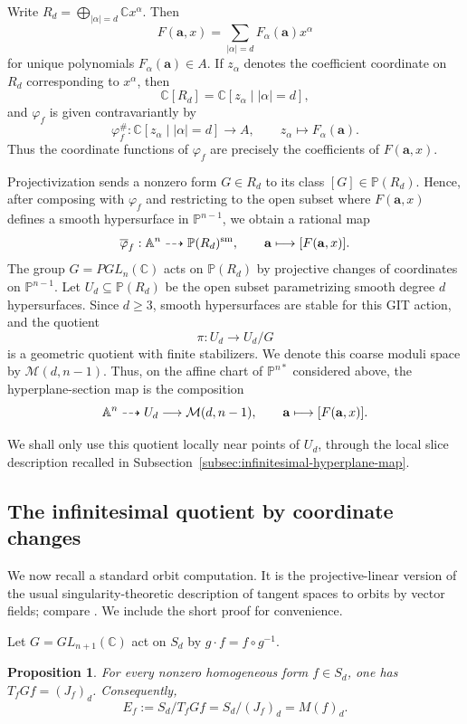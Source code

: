 \documentclass[11pt]{amsart}
\theoremstyle{plain}
\newtheorem{prop}[subsection]{Proposition}
\theoremstyle{definition}
\numberwithin{equation}{section}
\newcommand{\M}{{\mathcal M}}
\newcommand{\C}{\mathbb{C}}
\newcommand{\PP}{\mathbb{P}}
\newcommand{\AAA}{\mathbb{A}}
\begin{document}
Write $R_d=\bigoplus_{|\alpha|=d}\C x^\alpha$. Then
\[
F(\mathbf a,x)=\sum_{|\alpha|=d}F_\alpha(\mathbf a)x^\alpha
\]
for unique polynomials $F_\alpha(\mathbf a)\in A$. If $z_\alpha$ denotes the
coefficient coordinate on $R_d$ corresponding to $x^\alpha$, then
\[
\C[R_d]=\C[z_\alpha\mid |\alpha|=d],
\]
and $\varphi_f$ is given contravariantly by
\[
\varphi_f^\#:\C[z_\alpha\mid |\alpha|=d]\longrightarrow A,\qquad
z_\alpha\longmapsto F_\alpha(\mathbf a).
\]
Thus the coordinate functions of $\varphi_f$ are precisely the coefficients of
$F(\mathbf a,x)$.

Projectivization sends a nonzero form $G\in R_d$ to its class $[G]\in \PP(R_d)$.
Hence, after composing with $\varphi_f$ and restricting to the open subset where
$F(\mathbf a,x)$ defines a smooth hypersurface in $\PP^{n-1}$, we obtain a
rational map
\[
\overline{\varphi}_f:\AAA^n\dashrightarrow \PP(R_d)^{\rm sm},\qquad
\mathbf a\longmapsto [F(\mathbf a,x)].
\]
 The group $G=PGL_n(\C)$ acts on $\PP(R_d)$ by projective changes of coordinates
on $\PP^{n-1}$. Let $U_d\subseteq\PP(R_d)$ be the open subset parametrizing smooth
degree $d$ hypersurfaces. Since $d\geq3$, smooth hypersurfaces are stable for
this GIT action, and the quotient
\[
\pi:U_d\longrightarrow U_d/G
\]
is a geometric quotient with finite stabilizers. We denote this coarse moduli
space by $\M(d,n-1)$. Thus, on the affine chart of $\PP^{n*}$ considered above,
the hyperplane-section map is the composition
\[
\AAA^n\dashrightarrow U_d\longrightarrow \M(d,n-1),
\qquad
{\bf a}\longmapsto [F({\bf a},x)].
\]

We shall only use this quotient locally near points of $U_d$, through the local slice description recalled in Subsection~\ref{subsec:infinitesimal-hyperplane-map}.

\subsection{The infinitesimal quotient by coordinate changes}
\label{subsec:infinitesimal-quotient}
We now recall a standard orbit computation. It is the projective-linear version
of the usual singularity-theoretic description of tangent spaces to orbits by
vector fields; compare \cite[Chapter~4]{RCS}. We include the short proof for
convenience.

Let $G=GL_{n+1}(\C)$ act on $S_d$ by $g\cdot f=f\circ g^{-1}$.

\begin{prop}
\label{prop:tangent-orbit}
For every nonzero homogeneous form $f\in S_d$, one has
$T_fGf=(J_f)_d$. Consequently,
\[
E_f:=S_d/T_fGf=S_d/(J_f)_d=M(f)_d.
\]
\end{prop}
\end{document}
